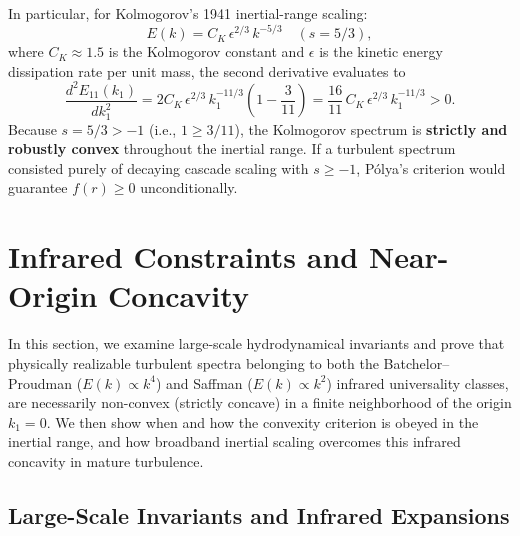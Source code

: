 \documentclass[lineno]{jfm}
\begin{document}
In particular, for Kolmogorov's 1941 inertial-range scaling:
\begin{equation}
E(k) = C_K\,\epsilon^{2/3}\,k^{-5/3} \quad (s = 5/3),
\label{eq:kolmogorov_spectrum}
\end{equation}
where $C_K \approx 1.5$ is the Kolmogorov constant and $\epsilon$ is the kinetic energy dissipation rate per unit mass, the second derivative evaluates to
\begin{equation}
\frac{d^2 E_{11}(k_1)}{d k_1^2} = 2 C_K\,\epsilon^{2/3}\,k_1^{-11/3} \left( 1 - \frac{3}{11} \right) = \frac{16}{11}\,C_K\,\epsilon^{2/3}\,k_1^{-11/3} > 0.
\label{eq:kolmogorov_convex}
\end{equation}
Because $s = 5/3 > -1$ (i.e., $1 \ge 3/11$), the Kolmogorov spectrum is \textbf{strictly and robustly convex} throughout the inertial range. If a turbulent spectrum consisted purely of decaying cascade scaling with $s \ge -1$, P\'olya's criterion would guarantee $f(r) \ge 0$ unconditionally.

\section{Infrared Constraints and Near-Origin Concavity}
\label{sec:infrared}

In this section, we examine large-scale hydrodynamical invariants and prove that physically realizable turbulent spectra belonging to both the Batchelor--Proudman ($E(k) \propto k^4$) and Saffman ($E(k) \propto k^2$) infrared universality classes, are necessarily non-convex (strictly concave) in a finite neighborhood of the origin $k_1 = 0$. We then show when and how the convexity criterion is obeyed in the inertial range, and how broadband inertial scaling overcomes this infrared concavity in mature turbulence.

\subsection{Large-Scale Invariants and Infrared Expansions}
\end{document}
